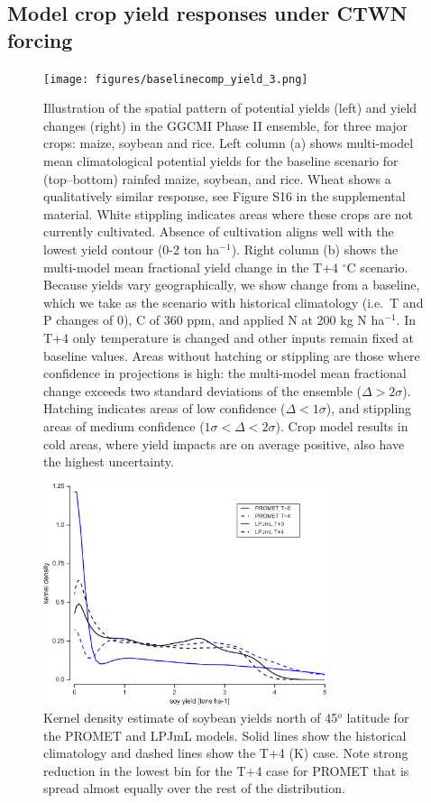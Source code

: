 \documentclass[gmd, manuscript]{copernicus} %
\begin{document}
\subsection{Model crop yield responses under CTWN forcing}
\begin{figure}[ht]
\centering
   \texttt{[image: figures/baselinecomp\_yield\_3.png]} 
  \caption{Illustration of the spatial pattern of potential yields (left) and yield changes (right) in the GGCMI Phase II ensemble, for three major crops: maize, soybean and rice. Left column (a) shows multi-model mean climatological potential yields for the baseline scenario for (top--bottom) rainfed maize, soybean, and rice. 
   Wheat shows a qualitatively similar response, see Figure S16 in the supplemental material. %
   White stippling indicates areas where these crops are not currently cultivated. 
   Absence of cultivation aligns well with the lowest yield contour (0-2 ton ha$^{-1}$). 
   Right column (b) shows the multi-model mean fractional yield change in the T+4 $^{\circ}$C scenario.
 Because yields vary geographically, we show change from a baseline, which we take as the scenario with historical climatology (i.e.\ T and P changes of 0), C of 360 ppm, and applied N at 200 kg N ha$^{-1}$. In T+4 only temperature is changed and other inputs remain fixed at baseline values. 
   Areas without hatching or stippling are those where confidence in projections is high: the multi-model mean fractional change exceeds two standard deviations of the ensemble ($\Delta > 2\sigma$). 
   Hatching indicates areas of low confidence ($\Delta < 1 \sigma$), and stippling areas of medium confidence ($1 \sigma < \Delta < 2 \sigma$). 
   Crop model results in cold areas, where yield impacts are on average positive, also have the highest uncertainty.}
   \label{fig:maizesoybaseline}
\end{figure}

\begin{figure}[ht]
\centering
   \includegraphics[width=8.3cm]{figures/testhighlatskde.png}
\caption{Kernel density estimate of soybean yields north of 45$^o$ latitude for the PROMET and LPJmL models. Solid lines show the historical climatology and dashed lines show the T+4 (K) case. Note strong reduction in the lowest bin for the T+4 case for PROMET that is spread almost equally over the rest of the distribution.}
\label{fig:highlat}
\end{figure}
\end{document}

